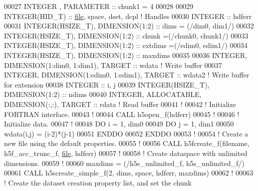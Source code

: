 \begin{DoxyCode}
00027   \textcolor{keywordtype}{INTEGER}          , \textcolor{keywordtype}{PARAMETER} :: chunk1   = 4
00028 
00029   \textcolor{keywordtype}{INTEGER(HID\_T)}  :: \hyperlink{structfile}{file}, space, dset, dcpl \textcolor{comment}{! Handles}
00030   \textcolor{keywordtype}{INTEGER}         :: hdferr
00031   \textcolor{keywordtype}{INTEGER(HSIZE\_T)}, \textcolor{keywordtype}{DIMENSION(1:2)} :: dims = (/dim0, dim1/)
00032   \textcolor{keywordtype}{INTEGER(HSIZE\_T)}, \textcolor{keywordtype}{DIMENSION(1:2)} :: chunk =(/chunk0, chunk1/)
00033   \textcolor{keywordtype}{INTEGER(HSIZE\_T)}, \textcolor{keywordtype}{DIMENSION(1:2)} :: extdims =(/edim0, edim1/)
00034   \textcolor{keywordtype}{INTEGER(HSIZE\_T)}, \textcolor{keywordtype}{DIMENSION(1:2)} :: maxdims
00035 
00036   \textcolor{keywordtype}{INTEGER}, \textcolor{keywordtype}{DIMENSION(1:dim0, 1:dim1)}, \textcolor{keywordtype}{TARGET} :: wdata \textcolor{comment}{! Write buffer}
00037   \textcolor{keywordtype}{INTEGER}, \textcolor{keywordtype}{DIMENSION(1:edim0, 1:edim1)}, \textcolor{keywordtype}{TARGET} :: wdata2 \textcolor{comment}{! Write buffer for extension}
00038   \textcolor{keywordtype}{INTEGER} :: i, j
00039   \textcolor{keywordtype}{INTEGER(HSIZE\_T)}, \textcolor{keywordtype}{DIMENSION(1:2)} :: ndims
00040   \textcolor{keywordtype}{INTEGER}, \textcolor{keywordtype}{ALLOCATABLE}, \textcolor{keywordtype}{DIMENSION(:,:)}, \textcolor{keywordtype}{TARGET} :: rdata    \textcolor{comment}{! Read buffer}
00041   \textcolor{comment}{!}
00042   \textcolor{comment}{! Initialize FORTRAN interface.}
00043   \textcolor{comment}{!}
00044   \textcolor{keyword}{CALL }h5open\_f(hdferr)
00045   \textcolor{comment}{!}
00046   \textcolor{comment}{! Initialize data.}
00047   \textcolor{comment}{!}
00048   \textcolor{keywordflow}{DO} i = 1, dim0
00049      \textcolor{keywordflow}{DO} j = 1, dim1
00050         wdata(i,j) = (i-2)*(j-1)
00051 \textcolor{keywordflow}{     ENDDO}
00052 \textcolor{keywordflow}{  ENDDO}
00053   \textcolor{comment}{!}
00054   \textcolor{comment}{! Create a new file using the default properties.}
00055   \textcolor{comment}{!}
00056   \textcolor{keyword}{CALL }h5fcreate\_f(filename, h5f\_acc\_trunc\_f, \hyperlink{structfile}{file}, hdferr)
00057   \textcolor{comment}{!}
00058   \textcolor{comment}{! Create dataspace with unlimited dimensions.}
00059   \textcolor{comment}{!}
00060   maxdims = (/h5s\_unlimited\_f, h5s\_unlimited\_f/)
00061   \textcolor{keyword}{CALL }h5screate\_simple\_f(2, dims, space, hdferr, maxdims)
00062   \textcolor{comment}{!}
00063   \textcolor{comment}{! Create the dataset creation property list, and set the chunk}

\end{DoxyCode}
